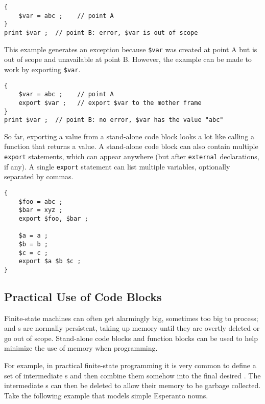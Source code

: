 \begin{samepage}
\begin{Verbatim}
{
    $var = abc ;	// point A
}
print $var ;  // point B: error, $var is out of scope
\end{Verbatim}
\end{samepage}

\noindent
This example generates an exception because \verb!$var! was created at point
A but is out of scope and unavailable at point B.  However, the example can be made to work by exporting \verb!$var!.

\begin{samepage}
\begin{Verbatim}
{
    $var = abc ;	// point A
    export $var ;	// export $var to the mother frame
}
print $var ;  // point B: no error, $var has the value "abc"
\end{Verbatim}
\end{samepage}

So far, exporting a value from a stand-alone code block looks a lot like
calling a function that returns a value.  A stand-alone code block can also
contain multiple \texttt{export} statements,
which can appear anywhere (but after \texttt{external} declarations, if
any).  A single \texttt{export} statement can list multiple variables,
optionally separated by commas.

\begin{samepage}
\begin{Verbatim}
{
    $foo = abc ;
    $bar = xyz ;
    export $foo, $bar ;

    $a = a ;
    $b = b ;
    $c = c ;
    export $a $b $c ;
}
\end{Verbatim}
\end{samepage}


\subsection{Practical Use of Code Blocks}

\label{sec:codeblock}

Finite-state machines can often get alarmingly big, sometimes too big to
process; and \fsm{}s are normally persistent, taking up memory until
they are overtly deleted or go out of scope.  Stand-alone code blocks and function blocks
can be used to help minimize the use of memory when programming.

For example, in practical finite-state programming it is very common to
define a set of intermediate \fsm{}s and then combine them somehow into
the final desired \fsm{}.  The intermediate \fsm{}s can then be deleted
to allow their memory to be garbage collected.  Take the following
example that models simple Esperanto nouns.

